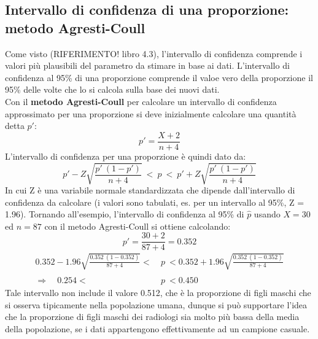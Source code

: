 \documentclass[drafts, 10pt]{book}
\newcounter{example}[section]
\begin{document}
\begin{example}
    \subsection{Intervallo di confidenza di una proporzione: metodo Agresti-Coull}
    Come visto (RIFERIMENTO! libro 4.3), l'intervallo di confidenza comprende i valori più plausibili del parametro da stimare in base ai dati. L'intervallo di confidenza al 95\% di una proporzione comprende il valoe vero della proporzione il 95\% delle volte che lo si calcola sulla base dei nuovi dati.
    \\
    Con il \textbf{metodo Agresti-Coull} per calcolare un intervallo di confidenza approssimato per una proporzione si deve inizialmente calcolare una quantità detta $p'$:
    \begin{equation}
    p' = \frac{X+2}{n+4}
    \end{equation}
    L'intervallo di confidenza per una proporzione è quindi dato da:
    \begin{equation}
    p' - Z\sqrt{\frac{p' \ (1-p')}{n+4}} \ < \ p \ < \ p' + Z\sqrt{\frac{p' \ (1-p')}{n+4}}
    \end{equation}
    In cui Z è una variabile normale standardizzata che dipende dall'intervallo di confidenza da calcolare (i valori sono tabulati, es. per un intervallo al 95\%, Z = 1.96).
    Tornando all'esempio, l'intervallo di confidenza al 95\% di $\hat{p}$ usando $X = 30$ ed $n = 87$ con il metodo Agresti-Coull si ottiene calcolando:
    \begin{equation}
    p' = \frac{30+2}{87+4} = 0.352
    \end{equation}
    \begin{align*}
    0.352 - 1.96\sqrt{\frac{0.352 \ (1-0.352)}{87+4}} < \ &p \ < 0.352 + 1.96\sqrt{\frac{0.352 \ (1-0.352)}{87+4}}
    \\ \\
    \Rightarrow \quad 0.254 < \ &p \ <0.450
    \end{align*}
    Tale intervallo non include il valore 0.512, che è la proporzione di figli maschi che si osserva tipicamente nella popolazione umana, dunque si può supportare l'idea che la proporzione di figli maschi dei radiologi sia molto più bassa della media della popolazione, se i dati appartengono effettivamente ad un campione casuale.


\end{example}
\end{document}
